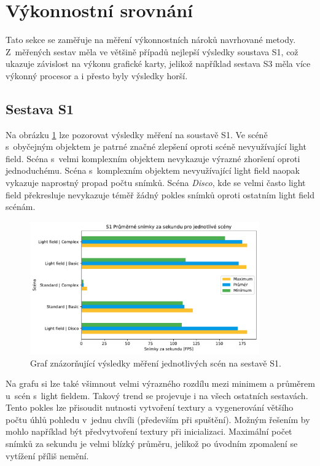 \section{Výkonnostní srovnání}
Tato sekce se zaměřuje na měření výkonnostních  nároků navrhované metody. Z~měřených sestav měla ve většině případů nejlepší výsledky soustava S1, což ukazuje závislost na výkonu grafické karty, jelikož například sestava S3 měla více výkonný procesor a i přesto byly výsledky horší. 

\subsection*{Sestava S1}
Na obrázku \ref{fig:graphS1Basic} lze pozorovat výsledky měření na soustavě S1. Ve scéně s~obyčejným objektem je patrné značné zlepšení oproti scéně nevyužívající light field. Scéna s~velmi komplexním objektem nevykazuje výrazné zhoršení oproti jednoduchému. Scéna s~komplexním objektem nevyužívající light field naopak vykazuje naprostný propad počtu snímků. Scéna \emph{Disco}, kde se velmi často light field překresluje nevykazuje téměř žádný pokles snímků oproti ostatním light field scénám.

\begin{figure}[H]
	\centering
		\includegraphics[width=0.88\textwidth]{obrazky-figures/graphS1basic.pdf}
	\caption{Graf znázorňující výsledky měření jednotlivých scén na sestavě S1.}
	\label{fig:graphS1Basic}
\end{figure}
Na grafu si lze také všimnout velmi výrazného rozdílu mezi minimem a průměrem u~scén s~light fieldem. Takový trend se projevuje i na všech ostatních sestavách. Tento pokles lze přisoudit nutnosti vytvoření textury a vygenerování většího počtu úhlů pohledu v~jednu chvíli (především při spuštění). Možným řešením by mohlo například být předvytvoření textury při inicializaci. Maximální počet snímků za sekundu je velmi blízký průměru, jelikož po úvodním zpomalení se vytížení příliš nemění. 


